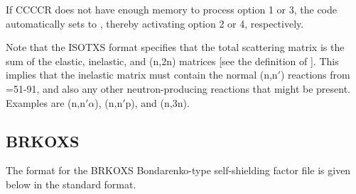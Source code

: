 If CCCCR does not have enough memory to process option 1 or 3, the
code automatically sets  to , thereby
activating option 2 or 4, respectively.

Note that the ISOTXS format specifies that the total scattering matrix
is the sum of the elastic, inelastic, and (n,2n) matrices [see the
definition of ].  This implies that the inelastic
matrix must contain the normal (n,n$'$) reactions from =51-91,
and also any other neutron-producing reactions that might be
present.  Examples are (n,n$'\alpha$), (n,n$'$p), and (n,3n).

\subsection{BRKOXS}
\label{ssCCCCR_BRKOXS}

The format for the BRKOXS Bondarenko-type self-shielding
factor file is given below in the standard format.

